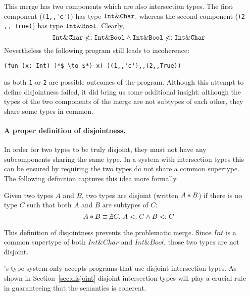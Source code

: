 \noindent This merge has two components which are also intersection
types. The first component (\lstinline{(1,,'c')}) has type $\texttt{Int} \&
\texttt{Char}$, whereas the second component (\lstinline{(2 ,, True)}) has type
$\texttt{Int} \& \texttt{Bool}$. Clearly,
\[ \texttt{Int} \& \texttt{Char} \not <: \texttt{Int} \& \texttt{Bool} \wedge \texttt{Int} \& \texttt{Bool} \not <: \texttt{Int} \& \texttt{Char} \]
Nevertheless the following program still leads to
incoherence:
\begin{lstlisting}
(fun (x: Int) (*$ \to $*) x) ((1,,'c'),,(2,,True))
\end{lstlisting}
as both \lstinline{1} or \lstinline{2} are possible outcomes
of the program. Although this attempt to define disjointness failed,
it did bring us some additional insight: although the types of the two
components of the merge are not subtypes of each other, they share
some types in common.

\paragraph{A proper definition of disjointness.} In order for two types
to be truly disjoint, they must not have any subcomponents sharing
the same type. In a system with intersection types this can be ensured
by requiring the two types do not share a common supertype. The
following definition captures this idea more formally.

\begin{definition}[Disjointness]
  Given two types $A$ and $B$, two types are disjoint
  (written $A * B$) if there is no type $C$ such that both $A$ and $B$ are
  subtypes of $C$:
  \[A * B \equiv \not\exists C.~A <: C \wedge B <: C\]
\end{definition}

\noindent This definition of disjointness prevents the problematic
merge. Since $Int$ is a common supertype of both $Int \& Char$ and
$Int \& Bool$, those two types are not disjoint.

\name's type system only accepts programs that use disjoint intersection
types. As shown in Section~\ref{sec:disjoint} disjoint intersection types will
play a crucial rule in guaranteeing that the semantics is coherent.

